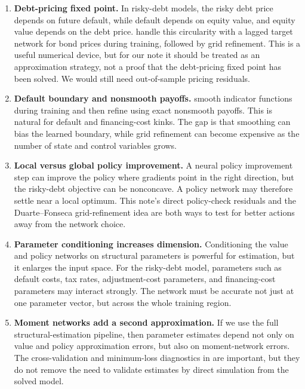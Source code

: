 \documentclass[11pt]{article}
\newcommand{\1}{\mathbf{1}}
\begin{document}
\begin{enumerate}[leftmargin=2em]
  \item \textbf{Debt-pricing fixed point.} In risky-debt models, the risky debt
  price depends on future default, while default depends on equity value, and
  equity value depends on the debt price. \citet[Appendix A.3.4]{duartefonseca2026ai}
  handle this circularity with a lagged target network for bond prices during
  training, followed by grid refinement. This is a useful numerical device, but
  for our note it should be treated as an approximation strategy, not a proof
  that the debt-pricing fixed point has been solved. We would still need
  out-of-sample pricing residuals.

  \item \textbf{Default boundary and nonsmooth payoffs.}
  \citet[Section 3.1.3 and Appendix A.4]{duartefonseca2026ai} smooth indicator
  functions during training and then refine using exact nonsmooth payoffs. This
  is natural for default and financing-cost kinks. The gap is that smoothing can
  bias the learned boundary, while grid refinement can become expensive as the
  number of state and control variables grows.

  \item \textbf{Local versus global policy improvement.} A neural policy
  improvement step can improve the policy where gradients point in the right
  direction, but the risky-debt objective can be nonconcave. A policy network
  may therefore settle near a local optimum. This note's direct policy-check
  residuals and the Duarte--Fonseca grid-refinement idea are both ways to test
  for better actions away from the network choice.

  \item \textbf{Parameter conditioning increases dimension.} Conditioning the
  value and policy networks on structural parameters is powerful for estimation,
  but it enlarges the input space. For the risky-debt model, parameters such as
  default costs, tax rates, adjustment-cost parameters, and financing-cost
  parameters may interact strongly. The network must be accurate not just at one
  parameter vector, but across the whole training region.

  \item \textbf{Moment networks add a second approximation.} If we use the full
  structural-estimation pipeline, then parameter estimates depend not only on
  value and policy approximation errors, but also on moment-network errors. The
  cross-validation and minimum-loss diagnostics in \citet[Sections 3.3 and
  3.6]{duartefonseca2026ai} are important, but they do not remove the need to
  validate estimates by direct simulation from the solved model.


\end{enumerate}
\end{document}
